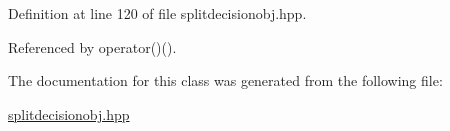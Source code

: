 \-Definition at line 120 of file splitdecisionobj.\-hpp.



\-Referenced by operator()().



\-The documentation for this class was generated from the following file\-:\begin{DoxyCompactItemize}
\item 
\hyperlink{splitdecisionobj_8hpp}{splitdecisionobj.\-hpp}\end{DoxyCompactItemize}
